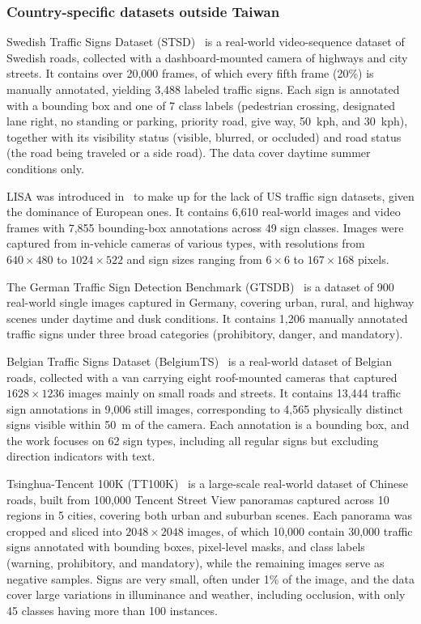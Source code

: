 \documentclass[runningheads]{llncs}
\begin{document}
\subsubsection{Country-specific datasets outside Taiwan}
Swedish Traffic Signs Dataset (STSD)~\cite{larsson2011using} is a real-world video-sequence dataset of Swedish roads, collected with a dashboard-mounted camera of highways and city streets. It contains over 20,000 frames, of which every fifth frame (20\%) is manually annotated, yielding 3,488 labeled traffic signs. Each sign is annotated with a bounding box and one of 7 class labels (pedestrian crossing, designated lane right, no standing or parking, priority road, give way, 50~kph, and 30~kph), together with its visibility status (visible, blurred, or occluded) and road status (the road being traveled or a side road). The data cover daytime summer conditions only.

LISA was introduced in~\cite{mogelmose2012vision} to make up for the lack of US traffic sign datasets, given the dominance of European ones. It contains 6,610 real-world images and video frames with 7,855 bounding-box annotations across 49 sign classes. Images were captured from in-vehicle cameras of various types, with resolutions from $640\times480$ to $1024\times522$ and sign sizes ranging from $6\times6$ to $167\times168$ pixels.

The German Traffic Sign Detection Benchmark (GTSDB)~\cite{houben2013detection} is a dataset of 900 real-world single images captured in Germany, covering urban, rural, and highway scenes under daytime and dusk conditions. It contains 1,206 manually annotated traffic signs under three broad categories (prohibitory, danger, and mandatory).

Belgian Traffic Signs Dataset (BelgiumTS)~\cite{timofte2014multi} is a real-world dataset of Belgian roads, collected with a van carrying eight roof-mounted cameras that captured $1628\times1236$ images mainly on small roads and streets. It contains 13,444 traffic sign annotations in 9,006 still images, corresponding to 4,565 physically distinct signs visible within 50~m of the camera. Each annotation is a bounding box, and the work focuses on 62 sign types, including all regular signs but excluding direction indicators with text.

Tsinghua-Tencent 100K (TT100K)~\cite{zhu2016traffic} is a large-scale real-world dataset of Chinese roads, built from 100,000 Tencent Street View panoramas captured across 10 regions in 5 cities, covering both urban and suburban scenes. Each panorama was cropped and sliced into $2048\times2048$ images, of which 10,000 contain 30,000 traffic signs annotated with bounding boxes, pixel-level masks, and class labels (warning, prohibitory, and mandatory), while the remaining images serve as negative samples. Signs are very small, often under 1\% of the image, and the data cover large variations in illuminance and weather, including occlusion, with only 45 classes having more than 100 instances.
\end{document}
